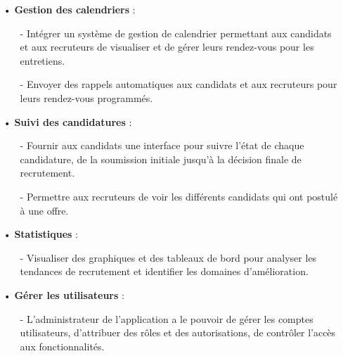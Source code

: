 \begin{itemize}
   \item[•] \textbf{Gestion des calendriers} :
   \begin{itemize}
    \setlength{\itemsep}{0.2cm}
       \item[-] Intégrer un système de gestion de calendrier permettant aux 
       candidats et aux recruteurs de visualiser et de gérer leurs 
       rendez-vous pour les entretiens.
       \item[-] Envoyer des rappels automatiques aux candidats et aux recruteurs pour leurs rendez-vous programmés.
   \end{itemize}
   
   \item[•] \textbf{Suivi des candidatures} :
   \begin{itemize}
    \setlength{\itemsep}{0.2cm}
       \item[-] Fournir aux candidats une interface pour suivre l'état 
       de chaque candidature, de la soumission initiale jusqu'à la 
       décision finale de recrutement.
       \item[-] Permettre aux recruteurs de voir les différents candidats 
       qui ont postulé à une offre.
   \end{itemize}
   
   \item[•] \textbf{Statistiques} :
   \begin{itemize}
    \setlength{\itemsep}{0.2cm}
       \item[-] Visualiser des graphiques et des tableaux de bord pour analyser les tendances de recrutement et identifier les domaines d'amélioration.
   \end{itemize}
   
   \item[•] \textbf{Gérer les utilisateurs} :
   \begin{itemize}
    \setlength{\itemsep}{0.2cm}
       \item[-] L'administrateur de l'application a le pouvoir de gérer les comptes utilisateurs, d'attribuer des rôles et des autorisations, de contrôler l'accès aux fonctionnalités.\\
       
   \end{itemize}
\end{itemize}



